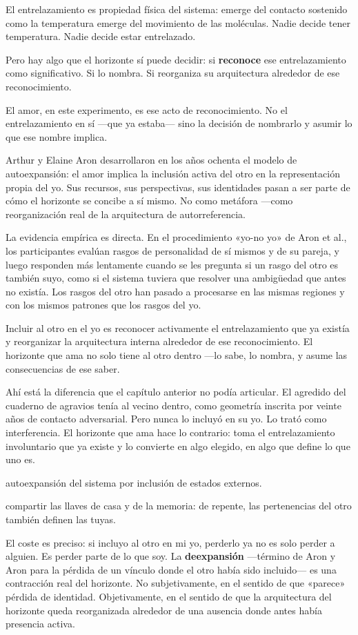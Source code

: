 El entrelazamiento es propiedad física del sistema: emerge del contacto sostenido como la temperatura emerge del movimiento de las moléculas. Nadie decide tener temperatura. Nadie decide estar entrelazado.

Pero hay algo que el horizonte sí puede decidir: si \textbf{reconoce} ese entrelazamiento como significativo. Si lo nombra. Si reorganiza su arquitectura alrededor de ese reconocimiento.

El amor, en este experimento, es ese acto de reconocimiento. No el entrelazamiento en sí —que ya estaba— sino la decisión de nombrarlo y asumir lo que ese nombre implica.

\noindent Arthur y Elaine Aron desarrollaron en los años ochenta el modelo de autoexpansión: el amor implica la inclusión activa del otro en la representación propia del yo. Sus recursos, sus perspectivas, sus identidades pasan a ser parte de cómo el horizonte se concibe a sí mismo. No como metáfora —como reorganización real de la arquitectura de autorreferencia.

La evidencia empírica es directa. En el procedimiento «yo-no yo» de Aron et al., los participantes evalúan rasgos de personalidad de sí mismos y de su pareja, y luego responden más lentamente cuando se les pregunta si un rasgo del otro es también suyo, como si el sistema tuviera que resolver una ambigüedad que antes no existía. Los rasgos del otro han pasado a procesarse en las mismas regiones y con los mismos patrones que los rasgos del yo.

Incluir al otro en el yo es reconocer activamente el entrelazamiento que ya existía y reorganizar la arquitectura interna alrededor de ese reconocimiento. El horizonte que ama no solo tiene al otro dentro —lo sabe, lo nombra, y asume las consecuencias de ese saber.

Ahí está la diferencia que el capítulo anterior no podía articular. El agredido del cuaderno de agravios tenía al vecino dentro, como geometría inscrita por veinte años de contacto adversarial. Pero nunca lo incluyó en su yo. Lo trató como interferencia. El horizonte que ama hace lo contrario: toma el entrelazamiento involuntario que ya existe y lo convierte en algo elegido, en algo que define lo que uno es.

\begin{fisica}
 autoexpansión del sistema por inclusión de estados externos.

 compartir las llaves de casa y de la memoria: de repente, las pertenencias del otro también definen las tuyas.
\end{fisica}
\noindent El coste es preciso: si incluyo al otro en mi yo, perderlo ya no es solo perder a alguien. Es perder parte de lo que soy. La \textbf{deexpansión} —término de Aron y Aron para la pérdida de un vínculo donde el otro había sido incluido— es una contracción real del horizonte. No subjetivamente, en el sentido de que «parece» pérdida de identidad. Objetivamente, en el sentido de que la arquitectura del horizonte queda reorganizada alrededor de una ausencia donde antes había presencia activa.

